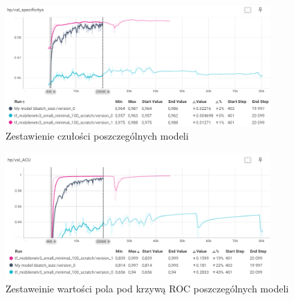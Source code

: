 \documentclass[12pt,twoside]{article}
\begin{document}
\begin{figure}[h]
	\centering
	\includegraphics[width=0.9\textwidth]{figures/hp_val_spec.png}
	\caption{Zestawienie czułości poszczególnych modeli}
	\label{fig:dasfe352ne}
\end{figure}

\begin{figure}[h]
	\centering
	\includegraphics[width=0.9\textwidth]{figures/hp_valACU.png}
	\caption{Zestaweinie wartości pola pod krzywą ROC poszczególnych modeli}
	\label{fig:dareg352ne}
\end{figure}
\end{document}
